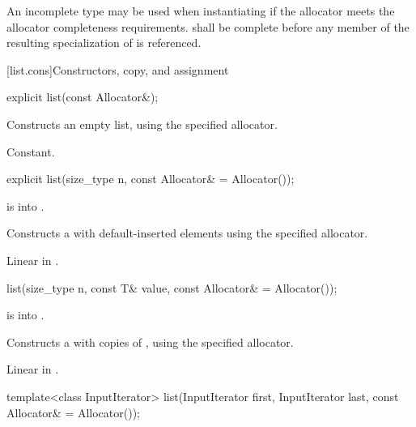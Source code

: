 \pnum
An incomplete type  may be used when instantiating 
if the allocator meets the
allocator completeness requirements.
 shall be complete before any member of the resulting specialization
of  is referenced.

[list.cons]{Constructors, copy, and assignment}

%
\begin{itemdecl}
explicit list(const Allocator&);
\end{itemdecl}

\begin{itemdescr}
\pnum
\effects
Constructs an empty list, using the specified allocator.

\pnum
\complexity
Constant.
\end{itemdescr}

%
\begin{itemdecl}
explicit list(size_type n, const Allocator& = Allocator());
\end{itemdecl}

\begin{itemdescr}
\pnum
\expects
{} is  into .

\pnum
\effects
Constructs a  with
 default-inserted elements using the specified allocator.

\pnum
\complexity
Linear in
.
\end{itemdescr}

%
\begin{itemdecl}
list(size_type n, const T& value, const Allocator& = Allocator());
\end{itemdecl}

\begin{itemdescr}
\pnum
\expects
{} is  into .

\pnum
\effects
Constructs a
with
copies of
,
using the specified allocator.

\pnum
\complexity
Linear in
.
\end{itemdescr}

%
\begin{itemdecl}
template<class InputIterator>
  list(InputIterator first, InputIterator last, const Allocator& = Allocator());
\end{itemdecl}

